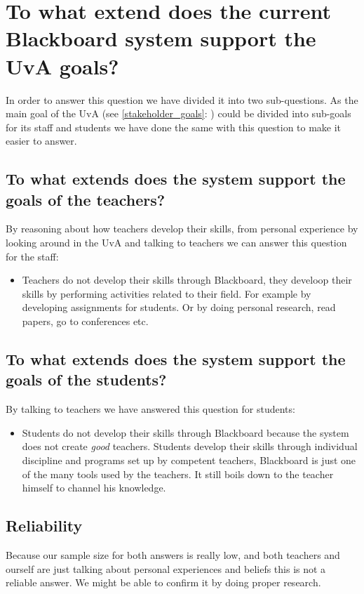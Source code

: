 \section{To what extend does the current Blackboard system support the UvA goals?} \label{uva_goal_question}
In order to answer this question we have divided it into two sub-questions. As the main goal of the UvA (see \ref{stakeholder_goals}: ) could be divided into sub-goals for its staff and students we have done the same with this question to make it easier to answer.

\subsection{To what extends does the system support the goals of the teachers?}
By reasoning about how teachers develop their skills, from personal experience by looking around in the UvA and talking to teachers we can answer this question for the staff:
\begin{itemize}
	\item Teachers do not develop their skills through Blackboard, they develoop their skills by performing activities related to their field. For example by developing assignments for students. Or by doing personal research, read papers, go to conferences etc.
\end{itemize}

\subsection{To what extends does the system support the goals of the students?}

By talking to teachers we have answered this question for students:
\begin{itemize}
	\item Students do not develop their skills through Blackboard because the system does not create \emph{good} teachers. Students develop their skills through individual discipline and programs set up by competent teachers, Blackboard is just one of the many tools used by the teachers. It still boils down to the teacher himself to channel his knowledge.
\end{itemize}

\subsection{Reliability}
Because our sample size for both answers is really low, and both teachers and ourself are just talking about personal experiences and beliefs this is not a reliable answer. We might be able to confirm it by doing proper research.

